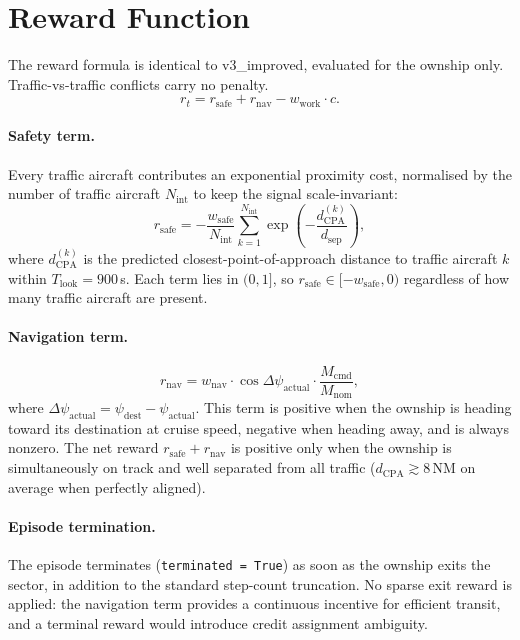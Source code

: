\documentclass[11pt, a4paper]{article}
\begin{document}
\section{Reward Function}

The reward formula is identical to v3\_improved, evaluated for the ownship only.
Traffic-vs-traffic conflicts carry no penalty.
\begin{equation}
    r_t = r_\text{safe} + r_\text{nav} - w_\text{work}\cdot c.
\end{equation}

\paragraph{Safety term.}
Every traffic aircraft contributes an exponential proximity cost, normalised by
the number of traffic aircraft $N_\text{int}$ to keep the signal scale-invariant:
\begin{equation}
    r_\text{safe}
        = -\frac{w_\text{safe}}{N_\text{int}}
          \sum_{k=1}^{N_\text{int}}
          \exp\!\!\left(-\frac{d_\text{CPA}^{(k)}}{d_\text{sep}}\right),
\end{equation}
where $d_\text{CPA}^{(k)}$ is the predicted closest-point-of-approach distance
to traffic aircraft $k$ within $T_\text{look} = 900$\,s.
Each term lies in $(0,1]$, so $r_\text{safe} \in [-w_\text{safe}, 0)$ regardless
of how many traffic aircraft are present.

\paragraph{Navigation term.}
\begin{equation}
    r_\text{nav}
        = w_\text{nav}\cdot\cos\!\Delta\psi_\text{actual}
          \cdot\frac{M_\text{cmd}}{M_\text{nom}},
\end{equation}
where $\Delta\psi_\text{actual} = \psi_\text{dest} - \psi_\text{actual}$.
This term is positive when the ownship is heading toward its destination at
cruise speed, negative when heading away, and is always nonzero.
The net reward $r_\text{safe} + r_\text{nav}$ is positive only when the ownship
is simultaneously on track and well separated from all traffic
($d_\text{CPA} \gtrsim 8$\,NM on average when perfectly aligned).

\paragraph{Episode termination.}
The episode terminates ({\tt terminated = True}) as soon as the ownship exits
the sector, in addition to the standard step-count truncation.
No sparse exit reward is applied: the navigation term provides a continuous
incentive for efficient transit, and a terminal reward would introduce credit
assignment ambiguity.
\end{document}
